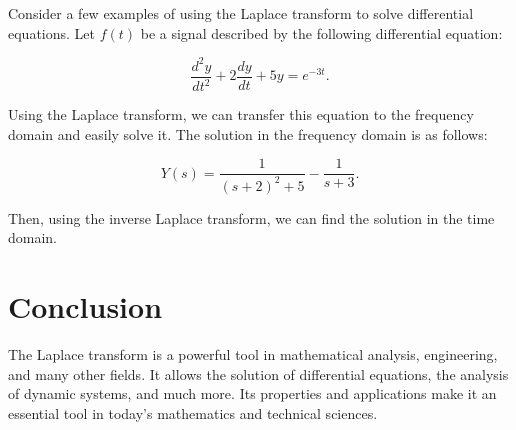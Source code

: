 \documentclass{article}
\begin{document}
Consider a few examples of using the Laplace transform to solve differential equations. Let $f(t)$ be a signal described by the following differential equation:

\begin{equation}
\frac{d^2y}{dt^2} + 2\frac{dy}{dt} + 5y = e^{-3t}.
\end{equation}

Using the Laplace transform, we can transfer this equation to the frequency domain and easily solve it. The solution in the frequency domain is as follows:

\begin{equation}
Y(s) = \frac{1}{(s+2)^2 + 5} - \frac{1}{s+3}.
\end{equation}

Then, using the inverse Laplace transform, we can find the solution in the time domain.

\section{Conclusion}

The Laplace transform is a powerful tool in mathematical analysis, engineering, and many other fields. It allows the solution of differential equations, the analysis of dynamic systems, and much more. Its properties and applications make it an essential tool in today's mathematics and technical sciences.
\end{document}
